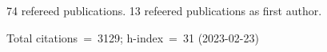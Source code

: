 74 refereed publications. 13 refeered publications as first author.

Total citations~=~3129; h-index~=~31 (2023-02-23)